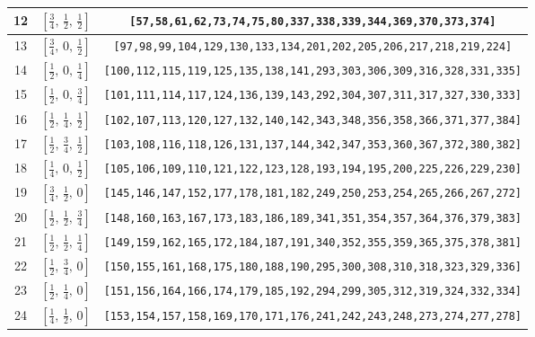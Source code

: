 \documentclass[fleqn,8pt]{jsarticle}
\begin{document}
\begin{longtable}{ccc}
12 & $\left[ \frac{3}{4},\, \frac{1}{2},\, \frac{1}{2} \right]$ & {\tt [57,58,61,62,73,74,75,80,337,338,339,344,369,370,373,374]} \\ \hline
13 & $\left[ \frac{3}{4},\, 0,\, \frac{1}{2} \right]$ & {\tt [97,98,99,104,129,130,133,134,201,202,205,206,217,218,219,224]} \\ \hline
14 & $\left[ \frac{1}{2},\, 0,\, \frac{1}{4} \right]$ & {\tt [100,112,115,119,125,135,138,141,293,303,306,309,316,328,331,335]} \\ \hline
15 & $\left[ \frac{1}{2},\, 0,\, \frac{3}{4} \right]$ & {\tt [101,111,114,117,124,136,139,143,292,304,307,311,317,327,330,333]} \\ \hline
16 & $\left[ \frac{1}{2},\, \frac{1}{4},\, \frac{1}{2} \right]$ & {\tt [102,107,113,120,127,132,140,142,343,348,356,358,366,371,377,384]} \\ \hline
17 & $\left[ \frac{1}{2},\, \frac{3}{4},\, \frac{1}{2} \right]$ & {\tt [103,108,116,118,126,131,137,144,342,347,353,360,367,372,380,382]} \\ \hline
18 & $\left[ \frac{1}{4},\, 0,\, \frac{1}{2} \right]$ & {\tt [105,106,109,110,121,122,123,128,193,194,195,200,225,226,229,230]} \\ \hline
19 & $\left[ \frac{3}{4},\, \frac{1}{2},\, 0 \right]$ & {\tt [145,146,147,152,177,178,181,182,249,250,253,254,265,266,267,272]} \\ \hline
20 & $\left[ \frac{1}{2},\, \frac{1}{2},\, \frac{3}{4} \right]$ & {\tt [148,160,163,167,173,183,186,189,341,351,354,357,364,376,379,383]} \\ \hline
21 & $\left[ \frac{1}{2},\, \frac{1}{2},\, \frac{1}{4} \right]$ & {\tt [149,159,162,165,172,184,187,191,340,352,355,359,365,375,378,381]} \\ \hline
22 & $\left[ \frac{1}{2},\, \frac{3}{4},\, 0 \right]$ & {\tt [150,155,161,168,175,180,188,190,295,300,308,310,318,323,329,336]} \\ \hline
23 & $\left[ \frac{1}{2},\, \frac{1}{4},\, 0 \right]$ & {\tt [151,156,164,166,174,179,185,192,294,299,305,312,319,324,332,334]} \\ \hline
24 & $\left[ \frac{1}{4},\, \frac{1}{2},\, 0 \right]$ & {\tt [153,154,157,158,169,170,171,176,241,242,243,248,273,274,277,278]} \\
\end{longtable}
\renewcommand{\arraystretch}{1.2}
\end{document}
